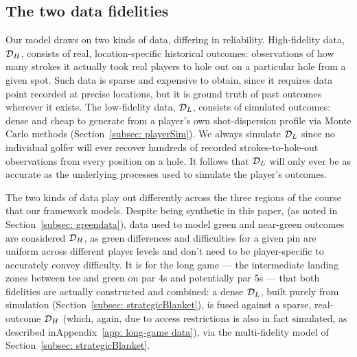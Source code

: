 \documentclass[11pt, letterpaper]{article}
\begin{document}
\subsection{The two data fidelities} 
\label{ref:idealData}

Our model draws on two kinds of data, differing in reliability. High-fidelity data, $ \mathcal{D}_H$, consists of real, location-specific historical outcomes: observations of how many strokes it actually took real players to hole out on a particular hole from a given spot. Such data is sparse and expensive to obtain, since it requires data point recorded at precise locations, but it is ground truth of past outcomes wherever it exists. The low-fidelity data, $ \mathcal{D}_L$, consists of simulated  outcomes: dense and cheap to generate from a player's own shot-dispersion profile via Monte Carlo
methods (Section~\ref{subsec: playerSim}). We always simulate $ \mathcal{D}_L$ since no individual golfer will ever recover hundreds of recorded strokes-to-hole-out observations from every position on a hole. It follows that $ \mathcal{D}_L$ will only ever be as accurate as the underlying processes used to simulate the player's outcomes.

The two kinds of data play out differently across the three regions of the course that our framework models. Despite being 
synthetic in this paper, (as noted in Section~\ref{subsec: greendata}), data used to model green and near-green outcomes are considered $ \mathcal{D}_H$, as green differences and difficulties for a given pin are uniform across different player levels and don't need to be player-specific to accurately convey difficulty.
It is for the long game --- the intermediate landing zones between tee and green on par 4s and potentially par 5s --- that both fidelities are actually constructed and combined: a dense $ \mathcal{D}_L$, built purely from simulation (Section~\ref{subsec: strategicBlanket}), is fused against a sparse, real-outcome $ \mathcal{D}_H$ (which, again, due to access restrictions is also in fact simulated, as described inAppendix~\ref{app: long-game data}), via the multi-fidelity model of Section~\ref{subsec: strategicBlanket}.
\end{document}
